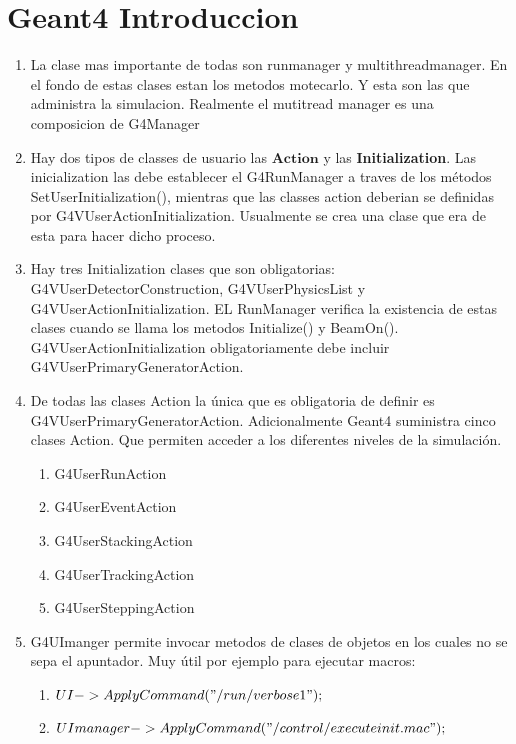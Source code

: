 \documentclass[10pt,a4paper,oneside]{book}
\begin{document}
\section*{Geant4 Introduccion}
\begin{enumerate}
\item La clase mas importante de todas son runmanager y
  multithreadmanager.  En el fondo de estas clases estan los metodos
  motecarlo. Y esta son las que administra la simulacion. Realmente el
  mutitread manager es una composicion de G4Manager
\item Hay dos tipos de classes de usuario las $\textbf{Action}$ y las
  \textbf{Initialization}. Las inicialization las debe establecer el
  G4RunManager a traves de los métodos SetUserInitialization(),
  mientras que las classes action deberian se definidas por
  G4VUserActionInitialization. Usualmente se crea una clase que era de
  esta para hacer dicho proceso.
\item Hay tres Initialization clases que son obligatorias:
  G4VUserDetectorConstruction, G4VUserPhysicsList y
  G4VUserActionInitialization. EL RunManager verifica la existencia de
  estas clases cuando se llama los metodos Initialize() y
  BeamOn(). G4VUserActionInitialization obligatoriamente debe incluir
  G4VUserPrimaryGeneratorAction.
\item De todas las clases Action la única que es obligatoria de
  definir es G4VUserPrimaryGeneratorAction. Adicionalmente Geant4
  suministra cinco clases Action. Que permiten acceder a los
  diferentes niveles de la simulación.
  \begin{enumerate}
  \item G4UserRunAction
  \item G4UserEventAction
  \item G4UserStackingAction
  \item G4UserTrackingAction
  \item G4UserSteppingAction
  \end{enumerate}

\item G4UImanger permite invocar metodos de clases de objetos en los
  cuales no se sepa el apuntador. Muy útil por ejemplo para ejecutar
  macros:
  \begin{enumerate}
  \item $ UI->ApplyCommand("/run/verbose 1");$
  \item $ UImanager->ApplyCommand("/control/execute init.mac"); $
  \end{enumerate}


\end{enumerate}
\end{document}
